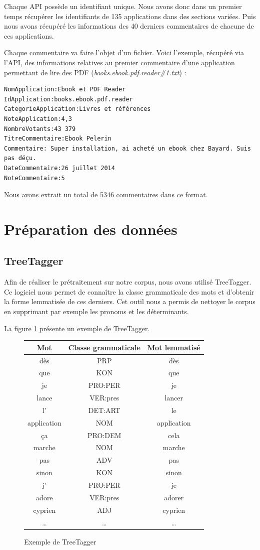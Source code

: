 \documentclass[a4paper, 11pt]{article}
\begin{document}
Chaque API possède un identifiant unique. Nous avons donc dans un premier temps récupérer les identifiants de 135 applications dans des sections variées. Puis nous avons récupéré les informations des 40 derniers commentaires de chacune de ces applications.

Chaque commentaire va faire l'objet d'un fichier. Voici l'exemple, récupéré via l'API, des informations relatives au premier commentaire d'une application permettant de lire des PDF (\textit{books.ebook.pdf.reader\#1.txt}) :

\begin{verbatim}
NomApplication:Ebook et PDF Reader
IdApplication:books.ebook.pdf.reader
CategorieApplication:Livres et références
NoteApplication:4,3
NombreVotants:43 379
TitreCommentaire:Ebook Pelerin
Commentaire: Super installation, ai acheté un ebook chez Bayard. Suis pas déçu.
DateCommentaire:26 juillet 2014
NoteCommentaire:5
\end{verbatim}


Nous avons extrait un total de 5346 commentaires dans ce format.

\section{Préparation des données}

\subsection{TreeTagger}
Afin de réaliser le prétraitement sur notre corpus, nous avons utilisé TreeTagger. Ce logiciel nous permet de connaître la classe grammaticale des mots et d’obtenir la forme lemmatisée de ces derniers. Cet outil nous a permis de nettoyer le corpus en supprimant par exemple les pronoms et les déterminants.

La figure \ref{treetagger} présente un exemple de TreeTagger.
\newpage
\begin{figure}[!h]
\centering
 \begin{tabular}{|c|c|c|}
 \hline
	Mot&Classe grammaticale&Mot lemmatisé\\
 \hline
    dès&PRP&dès\\
    que&KON&que\\
    je&PRO:PER&je\\
    lance&VER:pres&lancer\\
    l'&DET:ART&le\\
    application&NOM&application\\
    ça&PRO:DEM&cela\\
    marche&NOM&marche\\
    pas&ADV&pas\\
    sinon&KON&sinon\\
    j'&PRO:PER&je\\
    adore&VER:pres&adorer\\
    cyprien&ADJ&cyprien\\
    \dots&\dots&\dots\\
 \hline
 \end{tabular}
 \caption{Exemple de TreeTagger}
\label{treetagger}
\end{figure}
\end{document}
